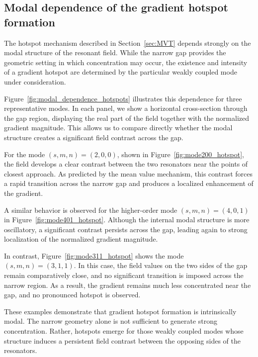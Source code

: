 \documentclass[10pt]{article}
\numberwithin{equation}{section}
\begin{document}
\subsection{Modal dependence of the gradient hotspot formation}\label{sec:modal_dependence}







The hotspot mechanism described in Section~\ref{sec:MVT} depends strongly on the modal structure of the resonant field. While the narrow gap provides the geometric setting in which concentration may occur, the existence and intensity of a gradient hotspot are determined by the particular weakly coupled mode under consideration.

Figure~\ref{fig:modal_dependence_hotspots} illustrates this dependence for three representative modes. In each panel, we show a horizontal cross-section through the gap region, displaying the real part of the field together with the normalized gradient magnitude. This allows us to compare directly whether the modal structure creates a significant field contrast across the gap.

For the mode $(s,m,n)=(2,0,0)$, shown in Figure~\ref{fig:mode200_hotspot}, the field develops a clear contrast between the two resonators near the points of closest approach. As predicted by the mean value mechanism, this contrast forces a rapid transition across the narrow gap and produces a localized enhancement of the gradient.

A similar behavior is observed for the higher-order mode $(s,m,n)=(4,0,1)$ in Figure~\ref{fig:mode401_hotspot}. Although the internal modal structure is more oscillatory, a significant contrast persists across the gap, leading again to strong localization of the normalized gradient magnitude.

In contrast, Figure~\ref{fig:mode311_hotspot} shows the mode $(s,m,n)=(3,1,1)$. In this case, the field values on the two sides of the gap remain comparatively close, and no significant transition is imposed across the narrow region. As a result, the gradient remains much less concentrated near the gap, and no pronounced hotspot is observed.

These examples demonstrate that gradient hotspot formation is intrinsically modal. The narrow geometry alone is not sufficient to generate strong concentration. Rather, hotspots emerge for those weakly coupled modes whose structure induces a persistent field contrast between the opposing sides of the resonators.
\end{document}

